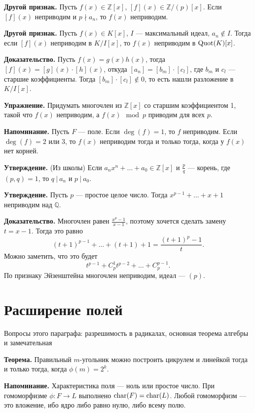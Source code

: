 \QED

\textbf{Другой признак.} Пусть $f(x) \in \mathbb Z[x]$, $[f](x) \in \mathbb Z/(p)[x]$.
Если $[f](x)$ неприводим и $p\nmid a_n$, то $f(x)$ неприводим.

\textbf{Другой признак.} Пусть $f(x) \in K[x]$, $I$ --- максимальный идеал, $a_n \not\in I$.
Тогда если $[f](x)$ неприводим в $K/I[x]$, то $f(x)$ неприводим в $\operatorname{Quot}(K)[x]$.

\textbf{Доказательство.} Пусть $f(x) = g(x) h(x)$, тогда $[f](x) = [g](x) \cdot [h](x)$, откуда $[a_n] = [b_m] \cdot [c_l]$, где $b_m$ и $c_l$ --- старшие коэффициенты.
Тогда $[b_m] \cdot [c_l] \not\in 0$, то есть нашли разложение в $K/I[x]$.

\QED

\textbf{Упражнение.} Придумать многочлен из $\mathbb Z[x]$ со старшим коэффициентом 1, такой что $f(x)$ неприводим, а $f(x) \mod p$ приводим для всех $p$.

\textbf{Напоминание.} Пусть $F$ --- поле. Если $\deg(f) = 1$, то $f$ неприводим.
Если $\deg(f) = 2$ или $3$, то $f(x)$ неприводим тогда и только тогда, когда у $f(x)$ нет корней.

\textbf{Утверждение.} (Из школы) Если $a_n x^n + \dots + a_0 \in \mathbb Z[x]$ и $\frac{p}{q}$ --- корень, где $(p, q) = 1$, то $q~|~a_n$ и $p~|~a_0$.

\textbf{Утверждение.} Пусть $p$ --- простое целое число.
Тогда $x^{p-1} + \dots + x + 1$ неприводим над $\mathbb Q$.

\textbf{Доказательство.} Многочлен равен $\frac{x^p - 1}{x - 1}$, поэтому хочется сделать замену $t = x - 1$.
Тогда это равно
\[
    (t + 1)^{p-1} + \dots + (t + 1) + 1 = \frac{(t + 1)^p - 1}{t}.
\]
Можно заметить, что это будет
\[
    t^{p-1} + C_p^1 t^{p-2} + \dots + C_p^{p-1}.
\]
По признаку Эйзенштейна многочлен неприводим, идеал --- $(p)$.

\QED

\section{Расширение полей}
Вопросы этого параграфа: разрешимость в радикалах, основная теорема алгебры и замечательная

\textbf{Теорема.} Правильный $m$-угольник можно построить цикрулем и линейкой тогда и только тогда, когда $\phi(m) = 2^k$.

\textbf{Напоминание.} Характеристика поля --- ноль или простое число. При гомоморфизме $\phi: F \to L$ выполнено $\operatorname{char}(F) = \operatorname{char}(L)$.
Любой гомоморфизм --- это вложение, ибо ядро либо равно нулю, либо всему полю.

